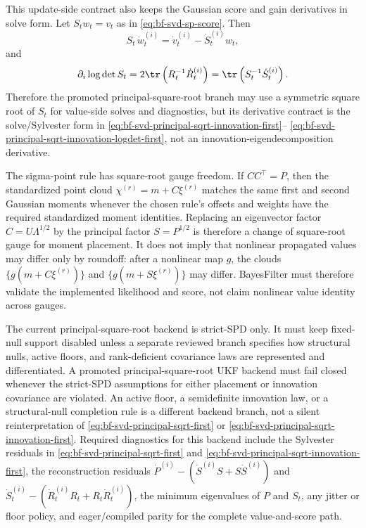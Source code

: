 This update-side contract also keeps the Gaussian score and gain derivatives in
solve form.  Let $S_tw_t=v_t$ as in
\eqref{eq:bf-svd-sp-score}.  Then
\begin{equation}
\label{eq:bf-svd-principal-sqrt-innovation-solve-first}
  S_t\,\dot w_t^{(i)}
  =
  \dot v_t^{(i)}-\dot S_t^{(i)}w_t,
\end{equation}
and
\begin{equation}
\label{eq:bf-svd-principal-sqrt-innovation-logdet-first}
  \partial_i\log\det S_t
  =
  2\tr\left(R_t^{-1}\dot R_t^{(i)}\right)
  =
  \tr\left(S_t^{-1}\dot S_t^{(i)}\right).
\end{equation}
Therefore the promoted principal-square-root branch may use a symmetric square
root of $S_t$ for value-side solves and diagnostics, but its derivative contract
is the solve/Sylvester form in
\eqref{eq:bf-svd-principal-sqrt-innovation-first}--
\eqref{eq:bf-svd-principal-sqrt-innovation-logdet-first}, not an
innovation-eigendecomposition derivative.

The sigma-point rule has square-root gauge freedom.  If $C C^\top=P$, then
the standardized point cloud $\chi^{(r)}=m+C\xi^{(r)}$ matches the same first
and second Gaussian moments whenever the chosen rule's offsets and weights
have the required standardized moment identities.  Replacing an eigenvector
factor $C=U\Lambda^{1/2}$ by the principal factor $S=P^{1/2}$ is therefore a
change of square-root gauge for moment placement.  It does not imply that
nonlinear propagated values may differ only by roundoff: after a nonlinear map
$g$, the clouds $\{g(m+C\xi^{(r)})\}$ and $\{g(m+S\xi^{(r)})\}$ may differ.
BayesFilter must therefore validate the implemented likelihood and score, not
claim nonlinear value identity across gauges.

The current principal-square-root backend is strict-SPD only.  It must keep
fixed-null support disabled unless a separate reviewed branch specifies how
structural nulls, active floors, and rank-deficient covariance laws are
represented and differentiated.  A promoted principal-square-root UKF backend
must fail closed whenever the strict-SPD assumptions for either placement or
innovation covariance are violated.  An active floor, a semidefinite innovation
law, or a structural-null completion rule is a different backend branch, not a
silent reinterpretation of
\eqref{eq:bf-svd-principal-sqrt-first} or
\eqref{eq:bf-svd-principal-sqrt-innovation-first}.  Required diagnostics for
this backend include the Sylvester residuals in
\eqref{eq:bf-svd-principal-sqrt-first} and
\eqref{eq:bf-svd-principal-sqrt-innovation-first}, the reconstruction residuals
$\dot P^{(i)}-(\dot S^{(i)}S+S\dot S^{(i)})$ and
$\dot S_t^{(i)}-(\dot R_t^{(i)}R_t+R_t\dot R_t^{(i)})$, the minimum eigenvalues
of $P$ and $S_t$, any jitter or floor policy, and eager/compiled parity for the
complete value-and-score path.

